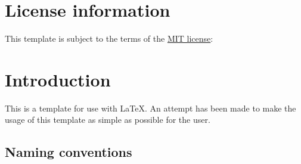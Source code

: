 

\section{License information}

This template is subject to the terms of the \href{https://opensource.org/licenses/mit-license.php}{MIT license}:

\begin{figure}[H]
    \scriptsize
\end{figure}

\section{Introduction}

This is a template for use with \LaTeX{}. An attempt has been made to make
the usage of this template as simple as possible for the user.

\subsection{Naming conventions}


